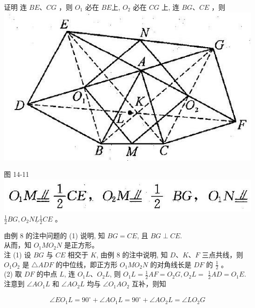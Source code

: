 \documentclass[10pt]{article}
\begin{document}
证明 连 $B E 、 C G$ ，则 $O_{1}$ 必在 $B E$上, $O_{2}$ 必在 $C G$ 上, 连 $B G 、 C E$ ，则\\
\includegraphics[max width=\textwidth, center]{2024_10_30_2c8f45efd4a519b08e1ag-133(1)}

图 14-11\\
\includegraphics[max width=\textwidth]{2024_10_30_2c8f45efd4a519b08e1ag-133} $\frac{1}{2} B G, O_{2} N \underline{L} \frac{1}{2} C E$ 。

由例 8 的注中问题的 (1) 说明, 知 $B G=C E$, 且 $B G \perp C E$.\\
从而，知 $O_{1} M O_{2} N$ 是正方形。\\
注 (1) 设 $B G$ 与 $C E$ 相交于 $K$, 由例 8 的注中说明, 知 $D 、 K 、 F$ 三点共线，则 $O_{1} O_{2}$ 是 $\triangle A D F$ 的中位线，即正方形 $O_{1} M O_{2} N$ 的对角线长是 $D F$ 的 $\frac{1}{2}$ 。\\
(2) 取 $D F$ 的中点 $L$, 连 $O_{1} L 、 O_{2} L$, 则 $O_{1} L=\frac{1}{2} A F=O_{2} G, O_{2} L=$ $\frac{1}{2} A D=O_{1} E$. 注意到 $\angle A O_{1} L$ 和 $\angle A O_{2} L$ 均与 $\angle O_{1} A O_{2}$ 互补，则知

\begin{align*}
\angle E O_{1} L=90^{\circ}+\angle A O_{1} L=90^{\circ}+\angle A O_{2} L=\angle L O_{2} G
\end{align*}
\end{document}
